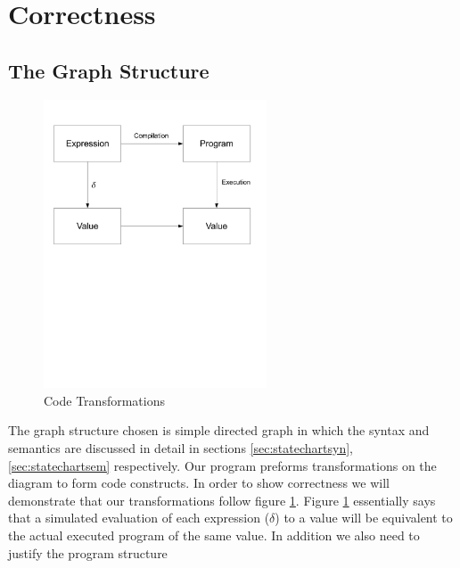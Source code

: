 \section{Correctness}
\subsection{The Graph Structure}
\begin{figure}[htb]
    \centering
    \includegraphics[trim= 10mm 120mm 10mm 10mm, clip, width=250px]{./images/correctness_graph1.pdf}
    \caption{Code Transformations}
    \label{fig:correctness_graph1}
\end{figure}
The graph structure chosen is simple directed graph in which the syntax and semantics are discussed in detail in sections \ref{sec:statechartsyn}, \ref{sec:statechartsem} respectively. Our program preforms transformations on the diagram to form code constructs. In order to show correctness we will demonstrate that our transformations follow figure \ref{fig:correctness_graph1}. Figure \ref{fig:correctness_graph1} essentially says that a simulated evaluation of each expression ($\delta$) to a value will be equivalent to the actual executed program of the same value. In addition we also need to justify the program structure

